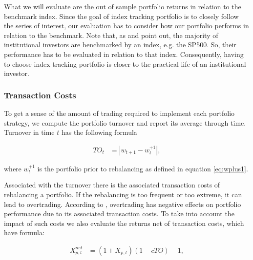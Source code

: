 \documentclass[12pt,oneside,a4paper]{memoir}
\begin{document}
What we will evaluate are the out of sample portfolio returns in relation to the benchmark index.
Since the goal of index tracking portfolio is to closely follow the series of interest, our evaluation has to consider how our portfolio performs in relation to the benchmark.
Note that, as  and  point out, the majority of institutional investors are benchmarked by an index, e.g. the SP500.
So, their performance has to be evaluated in relation to that index.
Consequently, having to choose index tracking portfolio is closer to the practical life of an institutional investor.



\subsubsection*{Transaction Costs}

To get a sense of the amount of trading required to implement each portfolio strategy, we compute the portfolio turnover and report its average through time.
Turnover in time $t$ has the following formula

\vspace{-18 pt}
\begin{align}
	\label{to}
	TO_{t} &= |w_{t+1} - w_{t}^{+1}|,
\end{align}

\noindent
where $w_{t}^{+1}$ is the portfolio prior to rebalancing as defined in equation \eqref{eq:wplus1}.

Associated with the turnover there is the associated transaction costs of rebalancing a portfolio.
If the rebalancing is too frequent or too extreme, it can lead to overtrading.
According to , overtrading has negative effects on portfolio performance due to its associated transaction costs.
To take into account the impact of such costs we also evaluate the returns net of transaction costs, which have formula:

\vspace{-18 pt}
\begin{align}
	X^{net}_{p,t} &= (1 + X_{p,t} )(1 - c TO) - 1,
\end{align}
\end{document}
